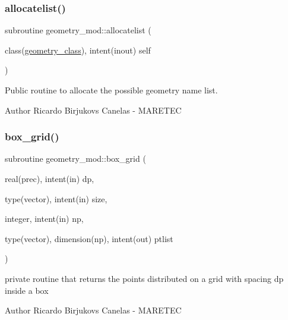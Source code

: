 \subsubsection{\texorpdfstring{allocatelist()}{allocatelist()}}
{\footnotesize\ttfamily subroutine geometry\+\_\+mod\+::allocatelist (\begin{DoxyParamCaption}\item[{class(\hyperlink{structgeometry__mod_1_1geometry__class}{geometry\+\_\+class}), intent(inout)}]{self }\end{DoxyParamCaption})\hspace{0.3cm}{\ttfamily [private]}}



Public routine to allocate the possible geometry name list. 

\begin{DoxyAuthor}{Author}
Ricardo Birjukovs Canelas -\/ M\+A\+R\+E\+T\+EC 
\end{DoxyAuthor}
\mbox{\label{namespacegeometry__mod_ae87e4ecff2d21a839da2b82919b5fd0b}} 
\subsubsection{\texorpdfstring{box\+\_\+grid()}{box\_grid()}}
{\footnotesize\ttfamily subroutine geometry\+\_\+mod\+::box\+\_\+grid (\begin{DoxyParamCaption}\item[{real(prec), intent(in)}]{dp,  }\item[{type(vector), intent(in)}]{size,  }\item[{integer, intent(in)}]{np,  }\item[{type(vector), dimension(np), intent(out)}]{ptlist }\end{DoxyParamCaption})\hspace{0.3cm}{\ttfamily [private]}}



private routine that returns the points distributed on a grid with spacing dp inside a box 

\begin{DoxyAuthor}{Author}
Ricardo Birjukovs Canelas -\/ M\+A\+R\+E\+T\+EC 
\end{DoxyAuthor}

